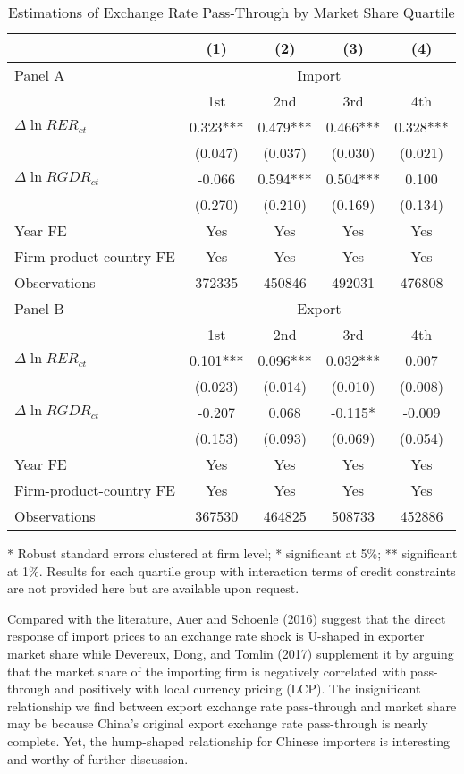\begin{table}[htbp]
	\centering
	\caption{Estimations of Exchange Rate Pass-Through by Market Share Quartile}
	\begin{threeparttable}
	\begin{tabular}{lcccc}
		\toprule
		& (1)   & (2)   & (3)   & (4) \\
		\midrule
		Panel A & \multicolumn{4}{c}{Import} \\
		& 1st   & 2nd   & 3rd   & 4th \\
		\midrule
		$\Delta \ln RER_{ct}$ & 0.323*** & 0.479*** & 0.466*** & 0.328*** \\
		& (0.047) & (0.037) & (0.030) & (0.021) \\
		$\Delta \ln RGDR_{ct}$ & -0.066 & 0.594*** & 0.504*** & 0.100 \\
		& (0.270) & (0.210) & (0.169) & (0.134) \\
		Year FE  & Yes   & Yes   & Yes   & Yes \\
		Firm-product-country FE & Yes   & Yes   & Yes   & Yes \\
		Observations & 372335 & 450846 & 492031 & 476808 \\
		\midrule
		Panel B & \multicolumn{4}{c}{Export} \\
		& 1st   & 2nd   & 3rd   & 4th \\
		\midrule
		$\Delta \ln RER_{ct}$ & 0.101*** & 0.096*** & 0.032*** & 0.007 \\
		& (0.023) & (0.014) & (0.010) & (0.008) \\
		$\Delta \ln RGDR_{ct}$ & -0.207 & 0.068 & -0.115* & -0.009 \\
		& (0.153) & (0.093) & (0.069) & (0.054) \\
		Year FE  & Yes   & Yes   & Yes   & Yes \\
		Firm-product-country FE & Yes   & Yes   & Yes   & Yes \\
		Observations & 367530 & 464825 & 508733 & 452886 \\
		\bottomrule
	\end{tabular}
	\begin{tablenotes}
		\footnotesize
		\item[*] Robust standard errors clustered at firm level; * significant at 5\%; ** significant at 1\%. Results for each quartile group with interaction terms of credit constraints are not provided here but are available upon request.
	\end{tablenotes}
	\end{threeparttable}
	\label{tab5.6}
\end{table}

Compared with the literature, Auer and Schoenle (2016)\cite{auer2016} suggest that the direct response of import prices to an exchange rate shock is U-shaped in exporter market share while Devereux, Dong, and Tomlin (2017)\cite{devereux2017} supplement it by arguing that the market share of the importing firm is negatively correlated with pass-through and positively with local currency pricing (LCP). The insignificant relationship we find between export exchange rate pass-through and market share may be because China's original export exchange rate pass-through is nearly complete. Yet, the hump-shaped relationship for Chinese importers is interesting and worthy of further discussion.
